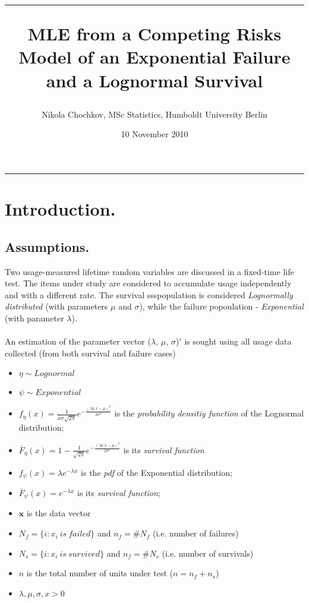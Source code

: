 \documentclass{article}
\title{\hrule \vspace{0.3cm}MLE from a Competing Risks Model of an Exponential Failure and a Lognormal Survival}
\date{10 November 2010}
\author{Nikola Chochkov, MSc Statistics, Humboldt University Berlin}
\begin{document}
\maketitle
\hrule
\section{Introduction.}
\subsection{Assumptions.}
\indent \indent Two usage-measured lifetime random variables are discussed in a fixed-time life test. The items under study are considered to accumulate usage independently and with a different rate. The survival ssspopulation is considered \textit{Lognormally distributed} (with parameters $\mu$ and $\sigma$), while the failure popoulation - \textit{Exponential} (with parameter $\lambda$). 
\\ 
\\ \indent An estimation of the parameter vector ($\lambda$, $\mu$, $\sigma$)$'$ is sought using all usage data collected (from both survival and failure cases) 
\begin{itemize}
\item $\eta \sim Lognormal$ 
\item $\psi \sim Exponential$ 
\item $f_\eta(x) = \frac{1}{x \sigma \sqrt{2 \pi}} e^{-\frac{\left( \ln x - \mu \right)^2}{2\sigma^2}}$ is the \textit{probability densitiy function} of the Lognormal distribution;
\item $\overline F_\eta(x) = 1 - \frac{1}{\sqrt{2 \pi}} e^{-\frac{\left( \ln x - \mu \right)^2}{2\sigma^2}}$ is its \textit{survival function}
\item $f_\psi(x) = \lambda e^{- \lambda x}$ is the \textit{pdf} of the Exponential distribution; 
\item $\overline F_\psi(x) = e^{- \lambda x}$ is its \textit{survival function};
\item $\textbf{x}$ is the data vector 
\item $N_f = \{i : x_i\ is\ failed \}$ and $n_f  = \# N_f$ (i.e. number of failures) 
\item $N_s = \{i : x_i\ is\ survived \}$ and $n_f  = \# N_s$ (i.e. number of survivals)
\item $n$ is the total number of units under test ($n = n_f + n_s$)
\item $\lambda, \mu, \sigma, x > 0$
\end{itemize}
\end{document}
